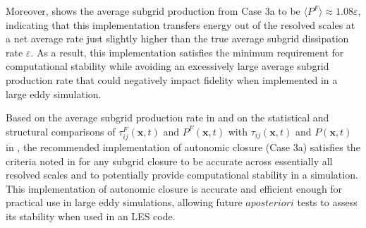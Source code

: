 Moreover,  shows the average subgrid production from Case 3a to be $\langle P^F \rangle \approx 1.08 \varepsilon$, indicating that this implementation transfers energy out of the resolved scales at a net average rate just slightly higher than the true average subgrid dissipation rate $\varepsilon$. As a result, this implementation satisfies the minimum requirement for computational stability while avoiding an excessively large average subgrid production rate that could negatively impact fidelity when implemented in a large eddy simulation.

Based on the average subgrid production rate in  and on the statistical and structural comparisons of  $\tau_{ij}^{F}(\mathbf{x},t)$ and $P^{F}(\mathbf{x},t)$  with  $\tau_{ij}(\mathbf{x},t)$ and  $P(\mathbf{x},t)$ in , the recommended implementation of autonomic closure (Case 3a) satisfies the criteria noted in  for any subgrid closure to be accurate across essentially all resolved scales and to potentially provide computational stability in a simulation. This implementation of autonomic closure is accurate and efficient enough for practical use in large eddy simulations, allowing future $a posteriori$ tests to assess its stability when used in an LES code.





% 

